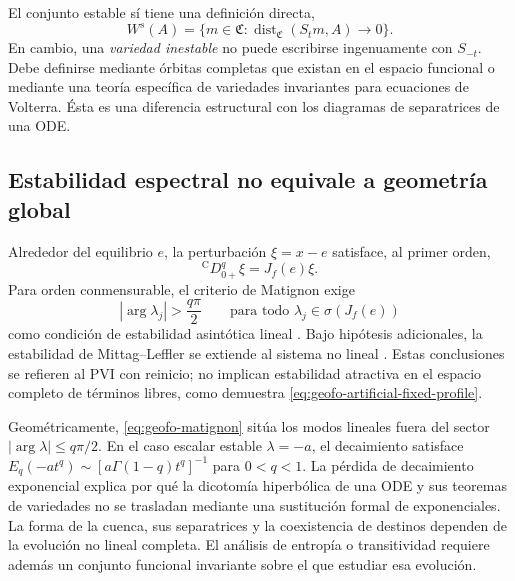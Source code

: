 El conjunto estable sí tiene una definición directa,
\begin{equation}
 W^s(A)=\{m\in\mathfrak C:
 \operatorname{dist}_{\mathfrak C}(S_tm,A)\to0\}.
 \label{eq:geofo-stable-set}
\end{equation}
En cambio, una \emph{variedad inestable} no puede escribirse ingenuamente con
\(S_{-t}\). Debe definirse mediante órbitas completas que existan en el
espacio funcional o mediante una teoría específica de variedades invariantes
para ecuaciones de Volterra. Ésta es una diferencia estructural con los
diagramas de separatrices de una ODE.

\subsection{Estabilidad espectral no equivale a geometría global}

Alrededor del equilibrio \(e\), la perturbación \(\xi=x-e\) satisface, al
primer orden,
\begin{equation}
 {}^{\mathrm C}D_{0+}^{q}\xi=J_f(e)\xi.
 \label{eq:geofo-linearization}
\end{equation}
Para orden conmensurable, el criterio de Matignon exige
\begin{equation}
 |\arg\lambda_j|>\frac{q\pi}{2}
 \qquad\text{para todo }\lambda_j\in\sigma(J_f(e))
 \label{eq:geofo-matignon}
\end{equation}
como condición de estabilidad asintótica lineal
\cite{Matignon1996}. Bajo hipótesis adicionales, la estabilidad de
Mittag--Leffler se extiende al sistema no lineal
\cite{LiChenPodlubny2009,CongTuanTrinh2020Asymptotic}. Estas conclusiones
se refieren al PVI con reinicio; no implican estabilidad atractiva en el
espacio completo de términos libres, como demuestra
\cref{eq:geofo-artificial-fixed-profile}.

Geométricamente, \cref{eq:geofo-matignon} sitúa los modos lineales fuera
del sector \(|\arg\lambda|\le q\pi/2\). En el caso escalar estable
\(\lambda=-a\), el decaimiento satisface
\(E_q(-at^q)\sim[ a\Gamma(1-q)t^q]^{-1}\) para \(0<q<1\).
La pérdida de decaimiento exponencial explica por qué la dicotomía
hiperbólica de una ODE y sus teoremas de variedades no se trasladan mediante
una sustitución formal de exponenciales. La forma de la cuenca, sus
separatrices y la coexistencia de destinos dependen de la evolución
no lineal completa. El análisis de entropía o transitividad requiere además
un conjunto funcional invariante sobre el que estudiar esa evolución.

